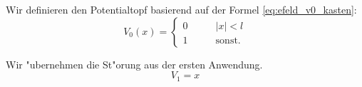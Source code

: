 \begin{refsection}
Wir definieren den Potentialtopf basierend auf der Formel \ref{eq:efeld_v0_kasten}:
\begin{equation}
  V_0(x)=\begin{cases}
    0       & \qquad |x|<l\\
    1  & \qquad\text{sonst.}
  \end{cases}
\end{equation}

Wir "ubernehmen die St"orung aus der ersten Anwendung.
\[
  V_1 = x
\]


\printbibliography[heading=subbibliography]
\end{refsection}

